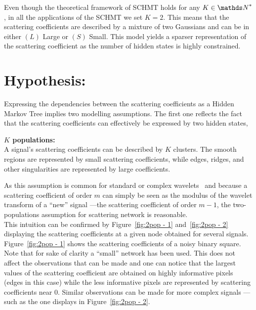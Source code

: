\documentclass[a4paper,11pt]{report}
\begin{document}
    Even though the theoretical framework of SCHMT holds for any $K \in \dsN^{\ast}$, in all the applications of the SCHMT we set $K=2$. This means that the scattering coefficients are described by a mixture of two Gaussians and can be in either $(L)$ Large or $(S)$ Small. This model yields a sparser representation of the scattering coefficient as the number of hidden states is highly constrained.
    
    
  \section{Hypothesis:}
    \label{sec:SCHMT/Hypos}
    
    Expressing the dependencies between the scattering coefficients as a Hidden Markov Tree implies two modelling assumptions. The first one reflects the fact that the scattering coefficients can effectively be expressed by two hidden states,\\
    
    \begin{assumption}\textbf{$K$ populations:}\\
			A signal's scattering coefficients can be described by $K$ clusters. The smooth regions are represented by small scattering coefficients, while edges, ridges, and other singularities are represented by large coefficients.\\
			\label{assum:2pop}
    \end{assumption}
    
    As this assumption is common for standard or complex wavelets~\citep{kingsbury2001complex} and because a scattering coefficient of order $m$ can simply be seen as the modulus of the wavelet transform of a ``new'' signal ---\ie the scattering coefficient of order $m-1$, the two-populations assumption for scattering network is reasonable.\\
    
    This intuition can be confirmed by Figure~\ref{fig:2pop - 1} and~\ref{fig:2pop - 2} displaying the scattering coefficients at a given node obtained for several signals. Figure~\ref{fig:2pop - 1} shows the scattering coefficients of a noisy binary square. Note that for sake of clarity a ``small'' network has been used. This does not affect the observations that can be made and one can notice that the largest values of the scattering coefficient are obtained on highly informative pixels (edges in this case) while the less informative pixels are represented by scattering coefficients near $0$. Similar observations can be made for more complex signals ---such as the one displays in Figure~\ref{fig:2pop - 2}.\\
 
\end{document}
